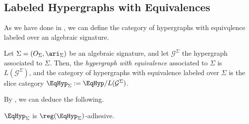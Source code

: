 \subsection{Labeled Hypergraphs with Equivalences}

As we have done in , we can define the category of hypergraphs with equivqlence labeled over an algebraic signature.

\begin{definition}
	Let $\Sigma = (O_\Sigma, \ari_\Sigma)$ be an algebraic signature, and let $\mathcal{G}^{\Sigma}$ the hypergraph associated to $\Sigma$.
	Then, the \emph{hypergraph with equivalence} associated to $\Sigma$ is $L(\mathcal{G}^\Sigma)$, and the category of hypergraphs with equivalence labeled over $\Sigma$ is the 
	slice category $\EqHyp_\Sigma := \EqHyp/L(\mathcal{G}^\Sigma)$.
\end{definition}

By , we can deduce the following.

\begin{proposition}
	$\EqHyp_\Sigma$ is $\reg (\EqHyp_\Sigma)$-adhesive.
\end{proposition}


